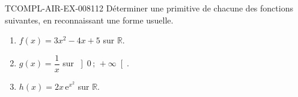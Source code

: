 \begin{exercice}{TCOMPL-AIR-EX-008}{1}{12}
Déterminer une primitive de chacune des fonctions suivantes, en reconnaissant
une forme usuelle.
\begin{enumerate}
  \item $f(x)=3x^2-4x+5$ sur $\mathbb{R}$.
  \item $g(x)=\dfrac{1}{x}$ sur $\left]0\,;\,+\infty\right[$.
  \item $h(x)=2x\,\mathrm{e}^{x^2}$ sur $\mathbb{R}$.
\end{enumerate}
\end{exercice}

